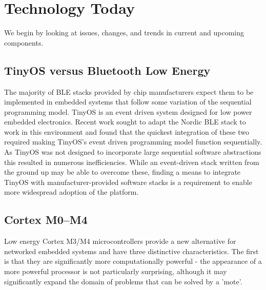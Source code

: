 \section{Technology Today}
We begin by looking at issues, changes, and trends in current and upcoming components.

\subsection{TinyOS versus Bluetooth Low Energy}

The majority of BLE stacks provided by chip manufacturers expect them to be
implemented in embedded systems that follow some variation of the sequential
programming model. TinyOS is an event driven system designed for low power
embedded electronics. Recent work sought to adapt the Nordic BLE stack to
work in this environment and found that the quickest integration of these two required
making TinyOS's event driven programming model function sequentially. As TinyOS
was not designed to incorporate large sequential software abstractions this
resulted in numerous inefficiencies. While an event-driven stack written from
the ground up may be able to overcome these, finding a means to integrate
TinyOS with manufacturer-provided software stacks is a requirement to enable
more widespread adoption of the platform.


\subsection{Cortex M0--M4}

Low energy Cortex M3/M4 microcontrollers provide a new alternative for
networked embedded systems and have three distinctive characteristics. The
first is that they are significantly more computationally powerful - the
appearance of a more powerful processor is not particularly surprising,
although it may significantly expand the domain of problems that can be solved
by a 'mote'.

